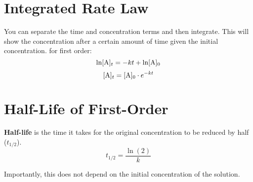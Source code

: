 \documentclass{article}
\begin{document}
\section{ Integrated Rate Law }

You can separate the time and concentration terms and then integrate. This will
show the concentration after a certain amount of time given the initial
concentration. for first order:
$$ \ln[ \ce{ A } ]_{t} = -kt + \ln[ \ce{ A } ]_{0} $$
$$ [ \ce{ A } ]_{t} = [ \ce{ A } ]_{0} \cdot e^{-kt} $$

\section{ Half-Life of First-Order }

\textbf{Half-life}  is the time it takes for the original concentration to be
reduced by half ($t_{1/2}$).
$$ t_{1/2} = \frac{ \ln( 2 ) }{ k } $$

Importantly, this does not depend on the initial concentration of the solution.
\end{document}
